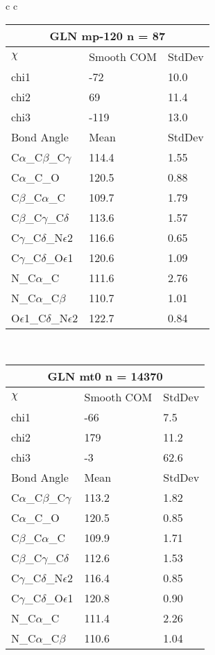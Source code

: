 \begin{longtable}{ c c }
\begin{tabular}{ l l l }
  \multicolumn{3}{c}{GLN \textbf{mp-120} n = 87} \\ \toprule
  $\chi$       & Smooth COM & StdDev \\ \midrule
  chi1 & -72 & 10.0 \\ 
  chi2 & 69 & 11.4 \\ 
  chi3 & -119 & 13.0 \\ \midrule
  Bond Angle   & Mean     & StdDev \\ \midrule
  C$\alpha$\_C$\beta$\_C$\gamma$ & 114.4 & 1.55\\
  C$\alpha$\_C\_O & 120.5 & 0.88\\
  C$\beta$\_C$\alpha$\_C & 109.7 & 1.79\\
  C$\beta$\_C$\gamma$\_C$\delta$ & 113.6 & 1.57\\
  C$\gamma$\_C$\delta$\_N$\epsilon$2 & 116.6 & 0.65\\
  C$\gamma$\_C$\delta$\_O$\epsilon$1 & 120.6 & 1.09\\
  N\_C$\alpha$\_C & 111.6 & 2.76\\
  N\_C$\alpha$\_C$\beta$ & 110.7 & 1.01\\
  O$\epsilon$1\_C$\delta$\_N$\epsilon$2 & 122.7 & 0.84\\
  \bottomrule
  \end{tabular}
  \\
  \begin{tabular}{ l l l }
  \toprule
  \multicolumn{3}{c}{GLN \textbf{mt0} n = 14370} \\ \toprule
  $\chi$       & Smooth COM & StdDev \\ \midrule
  chi1 & -66 & 7.5 \\ 
  chi2 & 179 & 11.2 \\ 
  chi3 & -3 & 62.6 \\ \midrule
  Bond Angle   & Mean     & StdDev \\ \midrule
  C$\alpha$\_C$\beta$\_C$\gamma$ & 113.2 & 1.82\\
  C$\alpha$\_C\_O & 120.5 & 0.85\\
  C$\beta$\_C$\alpha$\_C & 109.9 & 1.71\\
  C$\beta$\_C$\gamma$\_C$\delta$ & 112.6 & 1.53\\
  C$\gamma$\_C$\delta$\_N$\epsilon$2 & 116.4 & 0.85\\
  C$\gamma$\_C$\delta$\_O$\epsilon$1 & 120.8 & 0.90\\
  N\_C$\alpha$\_C & 111.4 & 2.26\\
  N\_C$\alpha$\_C$\beta$ & 110.6 & 1.04\\

\end{tabular}
\end{longtable}
